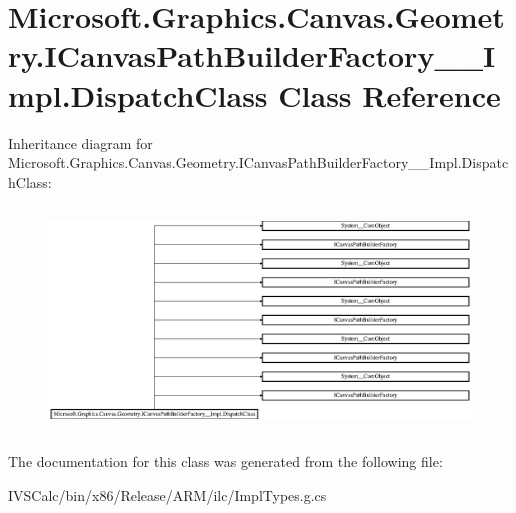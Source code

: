 \hypertarget{class_microsoft_1_1_graphics_1_1_canvas_1_1_geometry_1_1_i_canvas_path_builder_factory_____impl_1_1_dispatch_class}{}\section{Microsoft.\+Graphics.\+Canvas.\+Geometry.\+I\+Canvas\+Path\+Builder\+Factory\+\_\+\+\_\+\+Impl.\+Dispatch\+Class Class Reference}
\label{class_microsoft_1_1_graphics_1_1_canvas_1_1_geometry_1_1_i_canvas_path_builder_factory_____impl_1_1_dispatch_class}
Inheritance diagram for Microsoft.\+Graphics.\+Canvas.\+Geometry.\+I\+Canvas\+Path\+Builder\+Factory\+\_\+\+\_\+\+Impl.\+Dispatch\+Class\+:\begin{figure}[H]
\begin{center}
\leavevmode
\includegraphics[height=6.015625cm]{class_microsoft_1_1_graphics_1_1_canvas_1_1_geometry_1_1_i_canvas_path_builder_factory_____impl_1_1_dispatch_class}
\end{center}
\end{figure}


The documentation for this class was generated from the following file\+:\begin{DoxyCompactItemize}
\item 
I\+V\+S\+Calc/bin/x86/\+Release/\+A\+R\+M/ilc/Impl\+Types.\+g.\+cs\end{DoxyCompactItemize}
